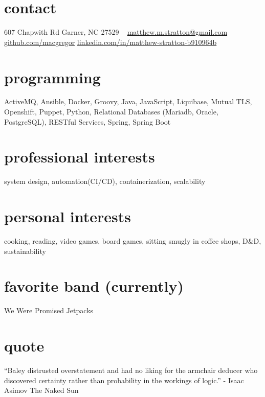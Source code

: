 
\begin{aside} %
\section{contact}
607 Chapwith Rd
Garner, NC 27529
~
\href{mailto:matthew.m.stratton@gmail.com}{\small{matthew.m.stratton@gmail.com}}
\href{https://github.com/macgregor}{github.com/macgregor}
\href{https://www.linkedin.com/in/matthew-stratton-b910964b}{\small{linkedin.com/in/matthew-stratton-b910964b}}
\section{programming}
ActiveMQ, Ansible, Docker, Groovy, Java, JavaScript, Liquibase, Mutual TLS, Openshift, Puppet, Python, Relational Databases (Mariadb, Oracle, PostgreSQL), RESTful Services, Spring, Spring Boot
\section{professional interests}
system design, automation(CI/CD), containerization, scalability
~
\section{personal interests}
cooking, reading, video games, board games, sitting smugly in coffee shops, D\&D, sustainability
~
\section{favorite band (currently)}
We Were Promised Jetpacks
~
\section{quote}
“Baley distrusted overstatement and had no liking for the armchair deducer who discovered certainty rather than probability in the workings of logic.” - Isaac Asimov The Naked Sun
~
\end{aside}
